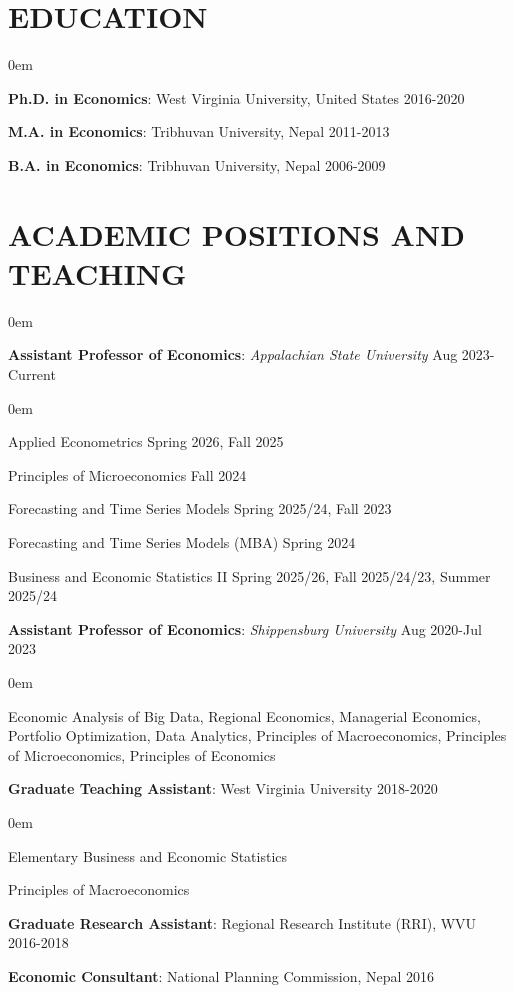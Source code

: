 \section*{EDUCATION}
\begin{list1}
\itemsep0em
\item[] \textbf{Ph.D. in Economics}: West Virginia University, United States \hfill 2016-2020
\item[] \textbf{M.A. in Economics}: Tribhuvan University, Nepal \hfill 2011-2013
\item[] \textbf{B.A. in Economics}: Tribhuvan University, Nepal \hfill 2006-2009
\end{list1}

\section*{ACADEMIC POSITIONS AND TEACHING}
\begin{list1}
\itemsep0em
\item[] \textbf{Assistant Professor of Economics}: \textit{Appalachian State University} \hfill Aug 2023-Current
\begin{list1}
\itemsep0em
\item[] Applied Econometrics \hfill Spring 2026, Fall 2025
\item[] Principles of Microeconomics \hfill Fall 2024
\item[] Forecasting and Time Series Models \hfill Spring 2025/24, Fall 2023
\item[] Forecasting and Time Series Models (MBA) \hfill Spring 2024
\item[] Business and Economic Statistics II \hfill Spring 2025/26, Fall 2025/24/23, Summer 2025/24
\end{list1}
\item[] \textbf{Assistant Professor of Economics}: \textit{Shippensburg University} \hfill Aug 2020-Jul 2023
\begin{list1}
\itemsep0em
\item[] Economic Analysis of Big Data, Regional Economics, Managerial Economics, Portfolio Optimization, Data Analytics, Principles of Macroeconomics, Principles of Microeconomics, Principles of Economics 
\end{list1}
\item[] \textbf{Graduate Teaching Assistant}: West Virginia University \hfill 2018-2020
\begin{list1}
\itemsep0em 
\item[] Elementary Business and Economic Statistics 
\item[] Principles of Macroeconomics 
\end{list1}
\item[] \textbf{Graduate Research Assistant}: Regional Research Institute (RRI), WVU \hfill 2016-2018
\item[] \textbf{Economic Consultant}: National Planning Commission, Nepal \hfill 2016
\end{list1}

